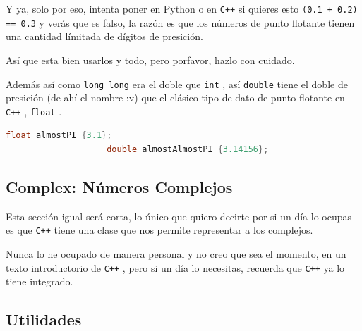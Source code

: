 \documentclass[12pt, fleqn]{report}                             %
\theoremstyle{break}                                            %
\newcommand{\textCode}[1]  { \texttt{#1} }                      %
\newcommand{\Cpp}{\ignorespaces\textCode{C++}}                  %
\begin{document}
                Y ya, solo por eso, intenta poner en Python o en \Cpp si quieres esto 
                \textCode{(0.1 + 0.2) == 0.3} y verás que es falso, la razón es que los números de punto
                flotante tienen una cantidad límitada de dígitos de presición.

                Así que esta bien usarlos y todo, pero porfavor, hazlo con cuidado.

                Además así como \textCode{long long} era el doble que \textCode{int}, así
                \textCode{double} tiene el doble de presición (de ahí el nombre :v) que el clásico
                tipo de dato de punto flotante en \Cpp, \textCode{float}.

                \begin{lstlisting}[language=C++, gobble=20]
                    float almostPI {3.1};
                    double almostAlmostPI {3.14156};
                \end{lstlisting}
                

            \subsection{Complex: Números Complejos}

                Esta sección igual será corta, lo único que quiero decirte por si un día lo ocupas
                es que \Cpp tiene una clase que nos permite representar a los complejos.

                Nunca lo he ocupado de manera personal y no creo que sea el momento, en un texto introductorio
                de \Cpp, pero si un día lo necesitas, recuerda que \Cpp ya lo tiene integrado.


            \clearpage
            \subsection{Utilidades}
\end{document}
